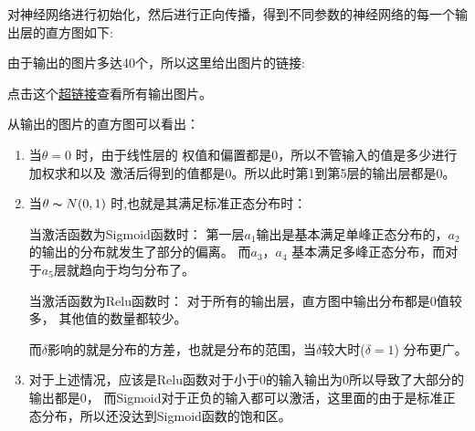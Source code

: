 \documentclass{homework}
\begin{document}
对神经网络进行初始化，然后进行正向传播，得到不同参数的神经网络的每一个输出层的直方图如下:

由于输出的图片多达40个，所以这里给出图片的链接:

点击这个\href{http://101.132.169.133/nnFeature/}{超链接}查看所有输出图片。


从输出的图片的直方图可以看出：
\begin{enumerate}
	\item 当$\theta = 0$ 时，由于线性层的
	权值和偏置都是0，所以不管输入的值是多少进行加权求和以及
	激活后得到的值都是0。所以此时第1到第5层的输出层都是0。

	\item 当$\theta \thicksim N(0,1)$ 时,也就是其满足标准正态分布时：
	
	当激活函数为Sigmoid函数时：
	第一层$a_1$输出是基本满足单峰正态分布的，$a_2$的输出的分布就发生了部分的偏离。
	而$a_3，a_4$ 基本满足多峰正态分布，而对于$a_5$层就趋向于均匀分布了。

	当激活函数为Relu函数时： 对于所有的输出层，直方图中输出分布都是0值较多，
	其他值的数量都较少。

	而$\delta$影响的就是分布的方差，也就是分布的范围，当$\delta$较大时($\delta=1$)
	分布更广。

	\item 对于上述情况，应该是Relu函数对于小于0的输入输出为0所以导致了大部分的输出都是0，
	而Sigmoid对于正负的输入都可以激活，这里面的由于是标准正态分布，所以还没达到Sigmoid函数的饱和区。
\end{enumerate}



\end{document}

